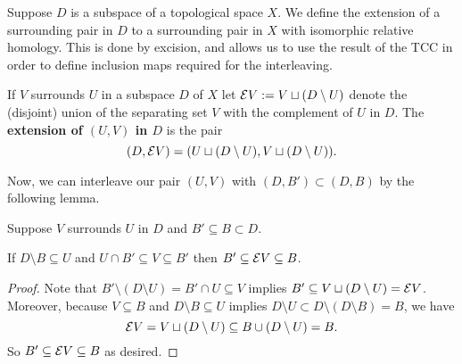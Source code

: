 

Suppose $D$ is a subspace of a topological space $X$.
We define the extension of a surrounding pair in $D$ to a surrounding pair in $X$ with isomorphic relative homology.
This is done by excision, and allows us to use the result of the TCC in order to define inclusion maps required for the interleaving.

\begin{definition}[Extension]
  If $V$ surrounds $U$ in a subspace $D$ of $X$ let $\mathcal{E} V := V\sqcup (D\setminus U)$ denote the (disjoint) union of the separating set $V$ with the complement of $U$ in $D$.
  The \textbf{extension of $(U, V)$ in $D$} is the pair
  \[ (D, \mathcal{E} V) = (U\sqcup (D\setminus U), V\sqcup (D\setminus U)).\]
\end{definition}

Now, we can interleave our pair $(U, V)$ with $(D, B')\subset (D, B)$ by the following lemma.

\begin{lemma}\label{lem:surround_and_cover}
  Suppose $V$ surrounds $U$ in $D$ and $B'\subseteq B\subset D$.

  If $D\setminus B\subseteq U$ and $U\cap B'\subseteq V\subseteq B'$ then $B'\subseteq \mathcal{E} V\subseteq B$.
\end{lemma}
\begin{proof}
  Note that $B'\setminus (D\setminus U) = B'\cap U\subseteq V$ implies $B'\subseteq V\sqcup(D\setminus U) = \mathcal{E} V$.
  Moreover, because $V\subseteq B$ and $D\setminus B\subseteq U$ implies $D\setminus U \subset D\setminus (D\setminus B) = B$, we have
  \[ \mathcal{E} V = V\sqcup (D\setminus U) \subseteq B\cup (D\setminus U) = B. \]
  So $B' \subseteq \mathcal{E} V\subseteq B$ as desired.
\end{proof}

